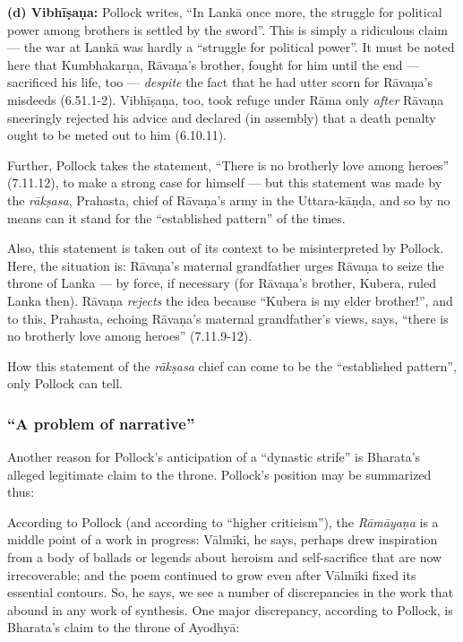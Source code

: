 \smallskip
\noindent
{\bf (d) Vibhīṣaṇa:} Pollock writes, “In Lankā once more, the struggle for political power among brothers is settled by the sword”. This is simply a ridiculous claim--- the war at Lankā was hardly a “struggle for political power”. It must be noted here that Kumbhakarṇa, Rāvaṇa’s brother, fought for him until the end --- sacrificed his life, too --- {\sl despite} the fact that he had utter scorn for Rāvaṇa’s misdeeds (6.51.1-2). Vibhīṣaṇa, too, took refuge under Rāma only {\sl after} Rāvaṇa sneeringly rejected his advice and declared (in assembly) that a death penalty ought to be meted out to him (6.10.11).

Further, Pollock takes the statement, “There is no brotherly love among heroes” (7.11.12), to make a strong case for himself --- but this statement was made by the {\sl rākṣasa}, Prahasta, chief of Rāvaṇa’s army in the Uttara-kāṇḍa, and so by no means can it stand for the “established pattern” of the times. 

Also, this statement is taken out of its context to be misinterpreted by Pollock. Here, the situation is: Rāvaṇa’s maternal grandfather urges Rāvaṇa to seize the throne of Lanka --- by force, if necessary (for Rāvaṇa’s brother, Kubera, ruled Lanka then). Rāvaṇa {\sl rejects} the idea because “Kubera is my elder brother!”, and to this, Prahasta, echoing Rāvaṇa’s maternal grandfather’s views, says, “there is no brotherly love among heroes” (7.11.9-12).

How this statement of the {\sl rākṣasa} chief can come to be the “established pattern”, only Pollock can tell. 


\subsubsection{“A problem of narrative”}\label{sec1.2.3.2}

Another reason for Pollock’s anticipation of a “dynastic strife” is Bharata’s alleged legitimate claim to the throne. Pollock’s position may be summarized thus: 

According to Pollock (and according to “higher criticism”), the {\sl Rāmāyaṇa} is a middle point of a work in progress: Vālmīki, he says, perhaps drew inspiration from a body of ballads or legends about heroism and self-sacrifice that are now irrecoverable; and the poem continued to grow even after Vālmīki fixed its essential contours. So, he says, we see a number of discrepancies in the work that abound in any work of synthesis. One major discrepancy, according to Pollock, is Bharata’s claim to the throne of Ayodhyā: 

